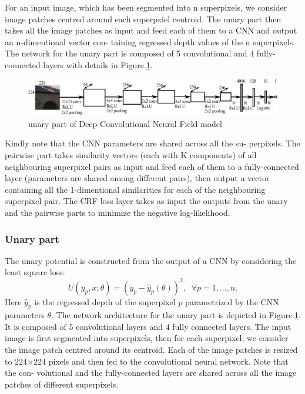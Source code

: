 \documentclass[10pt,twocolumn,letterpaper]{article}
\begin{document}
For an input image, which has been segmented into n superpixels, we 
consider image patches centred around each superpxiel centroid. The unary part 
then takes all the image patches as input and feed each of them to a CNN and 
output an n-dimentional vector con- taining regressed depth values of the n 
superpixels. The network for the unary part is composed of 5 convolutional and 
4 fully-connected layers with details in Figure.\ref{fig:unary}. 
\begin{figure}
\includegraphics[width=\linewidth]{../presentation/fig/cnn_unary.pdf}
\caption{unary part of Deep Convolutional Neural Field model}
\label{fig:unary}
\end{figure}

Kindly note that the CNN parameters are shared across all the su- perpixels. 
The pairwise part takes similarity vectors (each with K components) of all 
neighbouring superpixel pairs as input and feed each of them to a 
fully-connected layer (parameters are shared among different pairs), then output 
a vector containing all the 1-dimentional similarities for each of the 
neighbouring superpixel pair. The CRF loss layer takes as input the outputs from 
the unary and the pairwise parts to minimize the negative log-likelihood.
\subsubsection{Unary part}
The unary potential is constructed from the output of a CNN by considering the 
least square loss:
\begin{equation}\label{eq:unary}
U(y_{p}, x;\theta) = (y_p - \hat{y}_p (\theta))^2, \;\; \forall p=1,...,n.
\end{equation}
Here $\hat{y}_p$ is the regressed depth of the superpixel $p$ parametrized by 
the CNN parameters $\theta$. The network architecture for the unary part is 
depicted in Figure.\ref{fig:unary}. It is composed of 5 convolutional layers 
and 4 fully connected layers. The input image is first segmented into 
superpixels, then for each superpixel, we consider the image patch centred 
around its centroid. Each of the image patches is resized to 224×224 pixels and 
then fed to the convolutional neural network. Note that the con- volutional and 
the fully-connected layers are shared across all the image patches of different 
superpixels.
\end{document}
